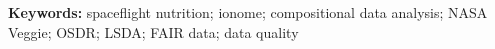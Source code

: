 \documentclass[11pt,a4paper]{article}
\begin{document}
\vspace{0.5em}
\noindent\textbf{Keywords:} spaceflight nutrition; ionome; compositional data
analysis; NASA Veggie; OSDR; LSDA; FAIR data; data quality










\end{document}

